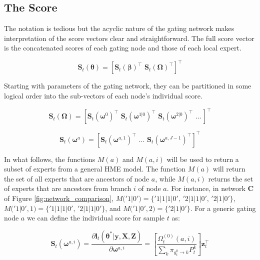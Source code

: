 \documentclass[12pt]{article}
\newcommand{\bw}[1]{\boldsymbol{\omega}^{#1}}
\newcommand{\gateprod}[2]{\pi_{#1 \longrightarrow #2}}
\newcommand{\FnOmegaNaught}[2]{\Omega^{(0)}_{t}( #1, #2 )}
\theoremstyle{definition}
\begin{document}
\subsection{The Score} \label{sec:TheScore}

The notation is tedious but the acyclic nature of the
gating network makes interpretation of the score vectors clear and
straightforward. The full score vector is the concatenated scores  
of each gating node and those of each local expert.

\begin{equation}
  \boldsymbol{S}_{t}(\boldsymbol{\theta}) = [ \boldsymbol{S}_{t}(\boldsymbol{\beta})^{\top} \,\, \boldsymbol{S}_{t}(\boldsymbol{\Omega})^{\top} ]^{\top}
\end{equation}

Starting with
parameters of the gating network, they can be partitioned 
in some logical order into the sub-vectors of each node's individual
score.

\begin{equation}
  \boldsymbol{S}_{t}(\boldsymbol{\Omega}) = [ \boldsymbol{S}_{t}(\boldsymbol{\omega}^{0})^{\top} \,\, \boldsymbol{S}_{t}(\boldsymbol{\omega}^{1 | 0})^{\top} \,\, \boldsymbol{S}_{t}(\boldsymbol{\omega}^{2 | 0})^{\top} \,\, \ldots \, ]^{\top}
\end{equation}

\begin{equation}
  \boldsymbol{S}_{t}(\boldsymbol{\omega}^{a}) = [ \boldsymbol{S}_{t}(\bw{a, 1})^{\top} \,\, \ldots \,\, \boldsymbol{S}_{t}(\bw{a, J - 1})^{\top} ]^{\top}
\end{equation}

In what follows, the functions $M(a)$ and $M(a, i)$ will be used to return
a subset of experts from a general HME model. The function $M(a)$ will
return the set of all experts that are ancestors of node $a$, while
$M(a, i)$ returns the set of experts that are ancestors from branch
$i$ of node $a$. For instance, in network $\boldsymbol{C}$ of Figure
\ref{fig:network_comparison}, $M('1|0') = \{'1|1|1|0', \, '2|1|1|0', \, '2|1|0'\}$,
$M('1|0', 1) = \{'1|1|1|0', \, '2|1|1|0'\}$, and $M('1|0', 2) = \{'2|1|0'\}$.
For a generic gating node $a$ we can define the individual score for 
sample $t$ as:

\begin{equation} \label{eq:gateScore}
  \boldsymbol{S}_{t}(\bw{a, i}) = \frac{\partial \boldsymbol{l}_{t}(\boldsymbol{\theta}^{*}| \boldsymbol{y}, \boldsymbol{X}, \boldsymbol{Z}) }{\partial \boldsymbol{\omega}^{a,i}} = \left[ \frac{ \FnOmegaNaught{a}{i} }{ \sum_{k} \gateprod{g^{0}_{t}}{k} P^{k}_{t} } \right] \boldsymbol{z}_{t}^{\top} 
\end{equation}
\end{document}
